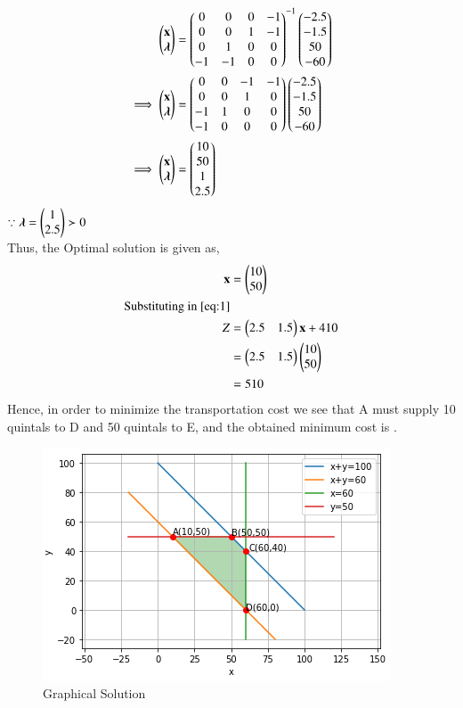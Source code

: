 \documentclass[journal,12pt,twocolumn]{IEEEtran}
\begin{document}
\begin{align}
    \begin{pmatrix}\mathbf{x} \\ \boldsymbol{\lambda}\end{pmatrix} &= \begin{pmatrix}0 & 0 & 0 & -1 \\ 0 & 0 & 1 & -1 \\ 0 & 1 & 0 & 0 \\ -1 & -1 & 0 & 0\end{pmatrix}^{-1}\begin{pmatrix}-2.5 \\ -1.5 \\ 50 \\ -60\end{pmatrix}
    \\
    \implies   \begin{pmatrix}\mathbf{x} \\ \boldsymbol{\lambda}\end{pmatrix} &= \begin{pmatrix}0 & 0 & -1 & -1 \\ 0 & 0 & 1 & 0 \\ -1 & 1 & 0 & 0 \\ -1 & 0 & 0 & 0\end{pmatrix}\begin{pmatrix}-2.5 \\ -1.5 \\ 50 \\ -60\end{pmatrix}
    \\
    \implies \begin{pmatrix}\mathbf{x} \\ \boldsymbol{\lambda}\end{pmatrix} &= \begin{pmatrix}10 \\ 50 \\ 1 \\ 2.5\end{pmatrix}
\end{align}
$\because \boldsymbol{\lambda}=\begin{pmatrix}1 \\ 2.5\end{pmatrix}\succ 0 $
\\
Thus, the Optimal solution is given as,
\begin{align}
    \mathbf{x} &= \begin{pmatrix}10\\50\end{pmatrix} \\
    \text{Substituting in \eqref{eq:1}}\\
    Z &= \begin{pmatrix}2.5 & 1.5\end{pmatrix}\mathbf{x} + 410 \\
    &= \begin{pmatrix}2.5 & 1.5\end{pmatrix}\begin{pmatrix}10 \\ 50\end{pmatrix} \\
    &= 510
\end{align}
Hence, in order to minimize the transportation cost we see that A must supply 10 quintals to D and 50 quintals to E, and the obtained minimum cost is .
\begin{figure}[!ht]
\centering
\includegraphics[width=\columnwidth]{graphical solution.PNG}
\caption{Graphical Solution}
\label{fig:Graphical Solution}	
\end{figure}
\end{document}
